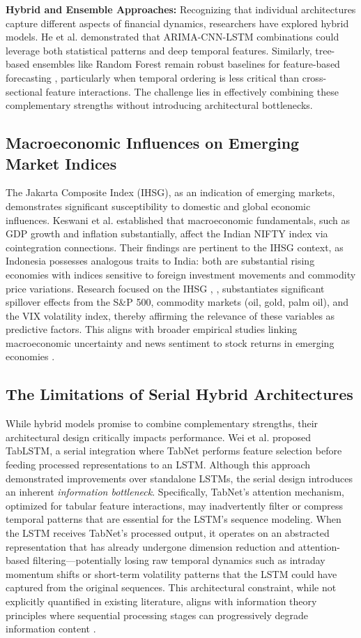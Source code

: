 \documentclass[conference]{IEEEtran}
\begin{document}
\textbf{Hybrid and Ensemble Approaches:} Recognizing that individual architectures capture different aspects of financial dynamics, researchers have explored hybrid models. He et al. \cite{b2} demonstrated that ARIMA-CNN-LSTM combinations could leverage both statistical patterns and deep temporal features. Similarly, tree-based ensembles like Random Forest remain robust baselines for feature-based forecasting \cite{b5}, particularly when temporal ordering is less critical than cross-sectional feature interactions. The challenge lies in effectively combining these complementary strengths without introducing architectural bottlenecks.

\subsection{Macroeconomic Influences on Emerging Market Indices}
The Jakarta Composite Index (IHSG), as an indication of emerging markets, demonstrates significant susceptibility to domestic and global economic influences. Keswani et al. \cite{b6} established that macroeconomic fundamentals, such as GDP growth and inflation substantially, affect the Indian NIFTY index via cointegration connections. Their findings are pertinent to the IHSG context, as Indonesia possesses analogous traits to India: both are substantial rising economies with indices sensitive to foreign investment movements and commodity price variations. Research focused on the IHSG \cite{b1}, \cite{b10}, \cite{b23} substantiates significant spillover effects from the S\&P 500, commodity markets (oil, gold, palm oil), and the VIX volatility index, thereby affirming the relevance of these variables as predictive factors. This aligns with broader empirical studies linking macroeconomic uncertainty and news sentiment to stock returns in emerging economies \cite{b14}.

\subsection{The Limitations of Serial Hybrid Architectures}
While hybrid models promise to combine complementary strengths, their architectural design critically impacts performance. Wei et al. \cite{b8} proposed TabLSTM, a serial integration where TabNet performs feature selection before feeding processed representations to an LSTM. Although this approach demonstrated improvements over standalone LSTMs, the serial design introduces an inherent \textit{information bottleneck}. Specifically, TabNet's attention mechanism, optimized for tabular feature interactions, may inadvertently filter or compress temporal patterns that are essential for the LSTM's sequence modeling. When the LSTM receives TabNet's processed output, it operates on an abstracted representation that has already undergone dimension reduction and attention-based filtering—potentially losing raw temporal dynamics such as intraday momentum shifts or short-term volatility patterns that the LSTM could have captured from the original sequences. This architectural constraint, while not explicitly quantified in existing literature, aligns with information theory principles where sequential processing stages can progressively degrade information content \cite{b13}.
\end{document}
